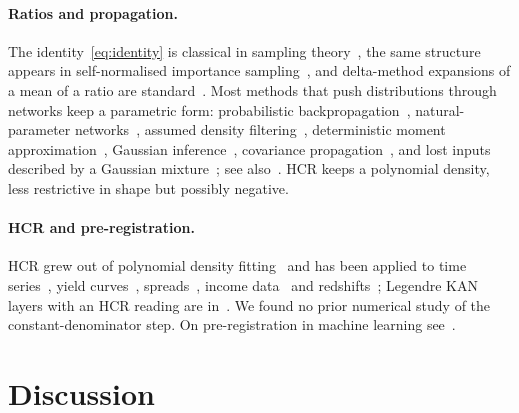 \documentclass[10pt,a4paper]{article}
\theoremstyle{upright}
\begin{document}
\paragraph{Ratios and propagation.} The identity~\eqref{eq:identity} is classical in sampling theory~\citep{hartley1954unbiased,schochet2022design,cochran1977sampling,meng1993absolute}, the same structure appears in self-normalised importance sampling~\citep{owen2013monte,cardoso2022brsnis}, and delta-method expansions of a mean of a ratio are standard~\citep{oehlert1992note}. Most methods that push distributions through networks keep a parametric form: probabilistic backpropagation~\citep{hernandezlobato2015probabilistic}, natural-parameter networks~\citep{wang2016natural}, assumed density filtering~\citep{gast2018lightweight}, deterministic moment approximation~\citep{wu2019deterministic}, Gaussian inference~\citep{goulet2021tractable}, covariance propagation~\citep{wright2024analytic}, and lost inputs described by a Gaussian mixture~\citep{smieja2018processing}; see also~\citep{julier2004unscented,minka2001expectation}. HCR keeps a polynomial density, less restrictive in shape but possibly negative.

\paragraph{HCR and pre-registration.} HCR grew out of polynomial density fitting~\citep{duda2017rapid,duda2018hierarchical} and has been applied to time series~\citep{duda2018exploiting}, yield curves~\citep{duda2018modeling}, spreads~\citep{duda2020modelling}, income data~\citep{duda2018credibility} and redshifts~\citep{duda2024predicting}; Legendre KAN layers with an HCR reading are in~\citep{strawa2025improving}. We found no prior numerical study of the constant-denominator step. On pre-registration in machine learning see~\citep{nosek2018preregistration,forde2019scientific,bertinetto2021preface,lipton2019troubling,pineau2021improving,sandve2013ten,stodden2016enhancing}.

\section{Discussion}\label{sec:discussion}
\end{document}
